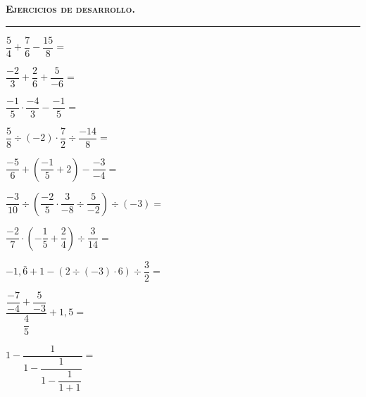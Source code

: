 \documentclass[spanish,letterpaper, 12pt, addpoints, answers]{exam}
\begin{document}
\parbox{16cm}{
{\textsc{\textbf{Ejercicios de desarrollo.}}}}

\vspace{0.15in}
\hrule 
\begin{questions}


\question[3]  $\dfrac{5}{4}+ \dfrac{7}{6}- \dfrac{15}{8} =$\\
\vspace{3cm}

\question[3]  $\dfrac{-2}{3}+ \dfrac{2}{6} + \dfrac{5}{-6}=$\\
\vspace{4cm}

\question[3]  $\dfrac{-1}{5}\cdot \dfrac{-4}{3}-\dfrac{-1}{5}=$\\
\vspace{4cm}

\question[3]  $\dfrac{5}{8}\div (-2)\cdot \dfrac{7}{2}\div \dfrac{-14}{8}=$\\
\vspace{7cm}

\question[3]  $\dfrac{-5}{6}+\left(\dfrac{-1}{5}+2\right)-\dfrac{-3}{-4}=$\\
\vspace{7cm}

\question[3]  $\dfrac{-3}{10}\div\left(\dfrac{-2}{5}\cdot\dfrac{3}{-8}\div\dfrac{5}{-2}\right)\div (-3)=$\\
\vspace{7cm}

\question[3]  $\dfrac{-2}{7}\cdot \left(-\dfrac{1}{5}+\dfrac{2}{4}\right)\div\dfrac{3}{14}=$\\
\vspace{10cm}

\question[3]  $-1{,}\bar{6}+1-\left(2\div(-3)\cdot 6\right)\div\dfrac{3}{2}=$\\
\vspace{10cm}

\question[3]  $\dfrac{\dfrac{-7}{-4}+\dfrac{5}{-3}}{\dfrac{4}{5}}+1{,}5=$\\
\vspace{10cm}

\question[3]  $1-\dfrac{1}{1-\dfrac{1}{1-\dfrac{1}{1+1}}}=$\\
\vspace{10cm}

\end{questions}
\end{document}
